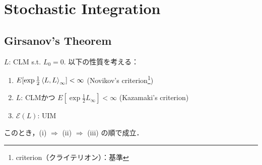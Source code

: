 \documentclass{jsarticle}
\title{}
\author{}
\date{
}
\begin{document}
\setcounter{section}{4}
\section{Stochastic Integration}
\setcounter{subsection}{4}
\subsection{Girsanov's Theorem}

\setcounter{thm}{22}
\begin{screen}
    \begin{thm}
    \label{thm:523}
        $L$: CLM s.t. $L_0=0.$
        以下の性質を考える：
        \begin{enumerate}[label=(\roman*)]
            \item
            $E[\exp\frac{1}{2}\left\langle L,L\right\rangle_{\infty}]<\infty$
            (Novikov's criterion\footnote{criterion（クライテリオン）：基準})
            \item
            $L$: CLMかつ $E[\exp\frac{1}{2}L_{\infty}]<\infty$
            (Kazamaki's criterion)
            \item
            $\mathcal{E}(L)$: UIM
        \end{enumerate}
        このとき，(i) $\Rightarrow$ (ii) $\Rightarrow$ (iii) の順で成立．
    \end{thm}
\end{screen}
\end{document}
